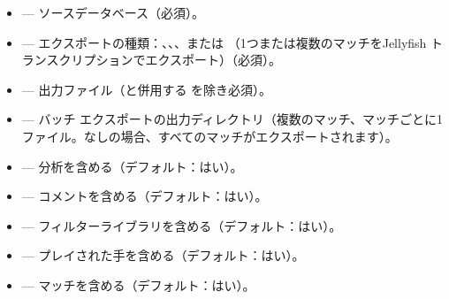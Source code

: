 \documentclass[letterpaper,10pt,dvipdfmx]{sphinxmanual}
\begin{document}
\sphinxAtStartPar
{}
\begin{itemize}
\item {} 
\sphinxAtStartPar
{} — ソースデータベース（必須）。

\item {} 
\sphinxAtStartPar
{} — エクスポートの種類：、、、または （1つまたは複数のマッチをJellyfish  トランスクリプションでエクスポート）（必須）。

\item {} 
\sphinxAtStartPar
{} — 出力ファイル（と併用する  を除き必須）。

\item {} 
\sphinxAtStartPar
{} — バッチ  エクスポートの出力ディレクトリ（複数のマッチ、マッチごとに1ファイル。なしの場合、すべてのマッチがエクスポートされます）。

\item {} 
\sphinxAtStartPar
{} — 分析を含める（デフォルト：はい）。

\item {} 
\sphinxAtStartPar
{} — コメントを含める（デフォルト：はい）。

\item {} 
\sphinxAtStartPar
{} — フィルターライブラリを含める（デフォルト：はい）。

\item {} 
\sphinxAtStartPar
{} — プレイされた手を含める（デフォルト：はい）。

\item {} 
\sphinxAtStartPar
{} — マッチを含める（デフォルト：はい）。


\end{itemize}
\end{document}

